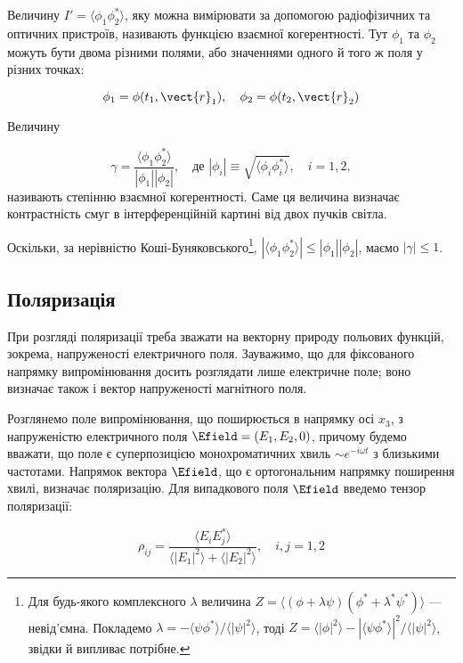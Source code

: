 Величину \(I' = \langle \phi_1 \phi_2^{*} \rangle\), яку можна вимірювати за допомогою радіофізичних та оптичних пристроїв, називають функцією взаємної
когерентності. Тут \(\phi_1\) та \(\phi_2\) можуть бути двома різними полями, або значеннями одного й того ж поля у різних точках:

\begin{equation*}
\phi_1 = \phi(t_1, \vect{r}_1), \quad \phi_2 = \phi(t_2, \vect{r}_2)
\end{equation*}

Величину

\begin{equation*}
\gamma = \frac{\langle \phi_1 \phi_2^{*} \rangle}{|\phi_1||\phi_2|}, \quad \text{де } |\phi_i| \equiv \sqrt{\langle \phi_i \phi_i^{*} \rangle}, \quad i
= 1, 2,
\end{equation*}
%
називають степінню взаємної когерентності. Саме ця величина визначає контрастність смуг в інтерференційній картині від двох пучків світла.

Оскільки, за нерівністю Коші-Буняковського\footnote{Для будь-якого комплексного \(\lambda\) величина \(Z = \langle (\phi + \lambda \psi)(\phi^{*} +
\lambda^{*} \psi^{*}) \rangle\) --- невід’ємна. Покладемо \(\lambda = -\langle \psi \phi^{*} \rangle / \langle |\psi|^2 \rangle\), тоді \(Z = \langle
|\phi|^2 \rangle - |\langle \psi \phi^{*} \rangle|^2 / \langle |\psi|^2 \rangle\), звідки й випливає потрібне.}, \(|\langle \phi_1 \phi_2^{*} \rangle|
\leq |\phi_1||\phi_2|\), маємо \(|\gamma| \leq 1\).

\subsection*{Поляризація}

При розгляді поляризації треба зважати на векторну природу польових функцій, зокрема, напруженості електричного поля. Зауважимо, що для фіксованого
напрямку випромінювання досить розглядати лише електричне поле; воно визначає також і вектор напруженості магнітного поля.

Розглянемо поле випромінювання, що поширюється в напрямку осі \(x_3\), з напруженістю електричного поля \(\Efield = (E_1, E_2, 0)\), причому будемо
вважати, що поле є суперпозицією монохроматичних хвиль \(\sim e^{-i\omega t}\) з близькими частотами. Напрямок вектора \(\Efield\), що є ортогональним
напрямку поширення хвилі, визначає поляризацію. Для випадкового поля \(\Efield\) введемо тензор поляризації:

\begin{equation}
\rho_{ij} = \frac{\langle E_i E_j^{*} \rangle}{\langle |E_1|^2 \rangle + \langle |E_2|^2 \rangle}, \quad i, j = 1, 2
\label{eq:polarization_tensor}
\end{equation}

